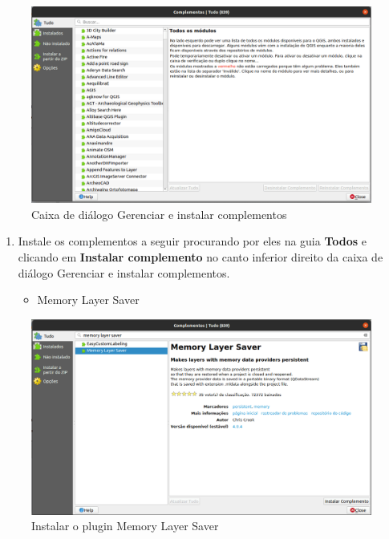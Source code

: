 \documentclass[
]{krantz}
\providecommand{\tightlist}{%
  \setlength{\itemsep}{0pt}\setlength{\parskip}{0pt}}
\begin{document}
\begin{figure}
\centering
\includegraphics{media/modulo1/manage-and-install-plugins-dialog.png}
\caption{Caixa de diálogo Gerenciar e instalar complementos}
\end{figure}

\begin{enumerate}
\def\labelenumi{\arabic{enumi}.}
\setcounter{enumi}{1}
\tightlist
\item
  Instale os complementos a seguir procurando por eles na guia \textbf{Todos} e clicando em \textbf{Instalar complemento} no canto inferior direito da caixa de diálogo Gerenciar e instalar complementos.

  \begin{itemize}
  \tightlist
  \item
    Memory Layer Saver
  \end{itemize}
\end{enumerate}

\begin{figure}
\centering
\includegraphics{media/modulo1/memory-layer-saver-plugin.png}
\caption{Instalar o plugin Memory Layer Saver}
\end{figure}
\end{document}
